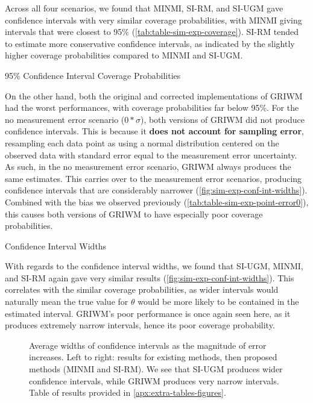 Across all four scenarios, we found that MINMI, SI-RM, and SI-UGM gave confidence intervals with very similar coverage probabilities, with MINMI giving intervals that were closest to 95\% (\autoref{tab:table-sim-exp-coverage}). SI-RM tended to estimate more conservative confidence intervals, as indicated by the slightly higher coverage probabilities compared to MINMI and SI-UGM.
\begin{table}[ht]
    \centering
    \caption{95\% Confidence Interval Coverage Probabilities}
    
    \label{tab:table-sim-exp-coverage}
    \vspace{-4mm}
\end{table}

On the other hand, both the original and corrected implementations of GRIWM had the worst performances, with coverage probabilities far below 95\%. For the no measurement error scenario ($0*\sigma$), both versions of GRIWM did not produce confidence intervals. This is because it \textbf{does not account for sampling error}, resampling each data point as using a normal distribution centered on the observed data with standard error equal to the measurement error uncertainty. As such, in the no measurement error scenario, GRIWM always produces the same estimates. This carries over to the measurement error scenarios, producing confidence intervals that are considerably narrower (\autoref{fig:sim-exp-conf-int-widths}). Combined with the bias we observed previously (\autoref{tab:table-sim-exp-point-error0}), this causes both versions of GRIWM to have especially poor coverage probabilities.
\begin{table}[ht]
    \centering
    \caption{Confidence Interval Widths}
    
    \label{tab:table-sim-exp-width}
\end{table}

With regards to the confidence interval widths, we found that SI-UGM, MINMI, and SI-RM again gave very similar results (\autoref{fig:sim-exp-conf-int-widths}). This correlates with the similar coverage probabilities, as wider intervals would naturally mean the true value for $\theta$ would be more likely to be contained in the  estimated interval. GRIWM's poor performance is once again seen here, as it produces extremely narrow intervals, hence its poor coverage probability.
\begin{figure}[ht]
    \centering
    
    \caption{Average widths of confidence intervals as the magnitude of error increases. Left to right: results for existing methods, then proposed methods (MINMI and SI-RM). We see that SI-UGM produces wider confidence intervals, while GRIWM produces very narrow intervals. Table of results provided in \autoref{apx:extra-tables-figures}.}
    \label{fig:sim-exp-conf-int-widths}
\end{figure}

